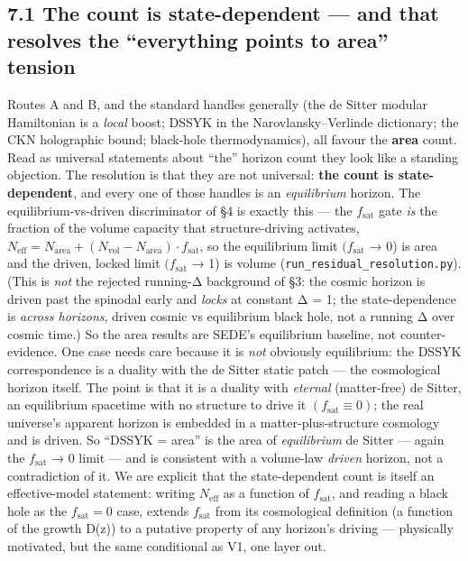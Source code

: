 \documentclass[
  10pt,
]{article}
\begin{document}
\subsection{7.1 The count is state-dependent --- and that resolves the
``everything points to area''
tension}\label{the-count-is-state-dependent-and-that-resolves-the-everything-points-to-area-tension}

Routes A and B, and the standard handles generally (the de Sitter
modular Hamiltonian is a \emph{local} boost; DSSYK in the
Narovlansky--Verlinde dictionary; the CKN holographic bound; black-hole
thermodynamics), all favour the \textbf{area} count. Read as universal
statements about ``the'' horizon count they look like a standing
objection. The resolution is that they are not universal: \textbf{the
count is state-dependent}, and every one of those handles is an
\emph{equilibrium} horizon. The equilibrium-vs-driven discriminator of
§4 is exactly this --- the \(f_{\mathrm{sat}}\) gate \emph{is} the
fraction of the volume capacity that structure-driving activates,
\(N_{\mathrm{eff}} = N_{\mathrm{area}} + (N_{\mathrm{vol}} - N_{\mathrm{area}})\cdot f_{\mathrm{sat}}\),
so the equilibrium limit \((f_{\mathrm{sat}}\) → 0) is area and the
driven, locked limit \((f_{\mathrm{sat}}\) → 1) is volume
(\texttt{run\_residual\_resolution.py}). (This is \emph{not} the
rejected running-Δ background of §3: the cosmic horizon is driven past
the spinodal early and \emph{locks} at constant Δ = 1; the
state-dependence is \emph{across horizons}, driven cosmic vs equilibrium
black hole, not a running Δ over cosmic time.) So the area results are
SEDE's equilibrium baseline, not counter-evidence. One case needs care
because it is \emph{not} obviously equilibrium: the DSSYK correspondence
is a duality with the de Sitter static patch --- the cosmological
horizon itself. The point is that it is a duality with \emph{eternal}
(matter-free) de Sitter, an equilibrium spacetime with no structure to
drive it \((f_{\mathrm{sat}} \equiv  0)\); the real universe's apparent
horizon is embedded in a matter-plus-structure cosmology and is driven.
So ``DSSYK = area'' is the area of \emph{equilibrium} de Sitter ---
again the \(f_{\mathrm{sat}}\) → 0 limit --- and is consistent with a
volume-law \emph{driven} horizon, not a contradiction of it. We are
explicit that the state-dependent count is itself an effective-model
statement: writing \(N_{\mathrm{eff}}\) as a function of
\(f_{\mathrm{sat}}\), and reading a black hole as the
\(f_{\mathrm{sat}} = 0\) case, extends \(f_{\mathrm{sat}}\) from its
cosmological definition (a function of the growth D(z)) to a putative
property of any horizon's driving --- physically motivated, but the same
conditional as V1, one layer out.
\end{document}

